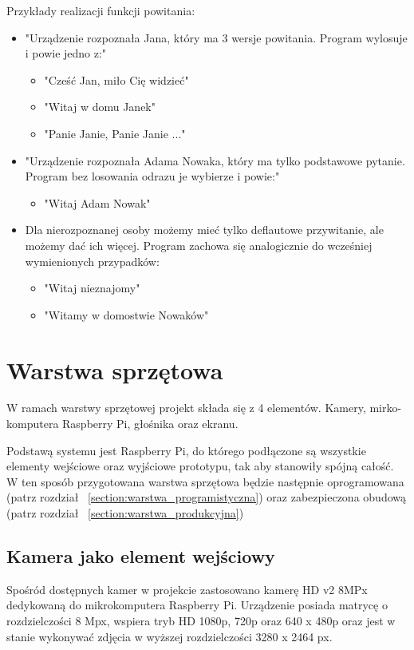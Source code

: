 \documentclass[a4paper,12pt,reqno]{article}
\begin{document}
Przykłady realizacji funkcji powitania:
\begin{itemize}
	\item "Urządzenie rozpoznała Jana, który ma 3 wersje powitania. Program wylosuje i powie jedno z:"
	\begin{itemize}
		\item "Cześć Jan, miło Cię widzieć"
		\item "Witaj w domu Janek"
		\item "Panie Janie, Panie Janie ..." %
	\end{itemize}
	\item "Urządzenie rozpoznała Adama Nowaka, który ma tylko podstawowe pytanie. Program bez losowania odrazu je wybierze i powie:"
	\begin{itemize}
		\item "Witaj Adam Nowak"
	\end{itemize}
	\item Dla nierozpoznanej osoby możemy mieć tylko deflautowe przywitanie, ale możemy dać ich więcej. Program zachowa się analogicznie do wcześniej wymienionych przypadków:
	\begin{itemize}
		\item "Witaj nieznajomy"
		\item "Witamy w domostwie Nowaków"
	\end{itemize}
\end{itemize}

\newpage
\section{Warstwa sprzętowa} \label{section:warstwa_sprzetowa}

W ramach warstwy sprzętowej projekt składa się z 4 elementów. Kamery, mirko-komputera Raspberry Pi, głośnika oraz ekranu.

Podstawą systemu jest Raspberry Pi, do którego podłączone są wszystkie elementy wejściowe oraz wyjściowe prototypu, tak aby stanowiły spójną całość. W ten sposób przygotowana warstwa sprzętowa będzie następnie oprogramowana (patrz rozdział ~\ref{section:warstwa_programistyczna}) oraz zabezpieczona obudową (patrz rozdział ~\ref{section:warstwa_produkcyjna})

\subsection{Kamera jako element wejściowy}

Spośród dostępnych kamer w projekcie zastosowano kamerę  HD v2 8MPx dedykowaną do mikrokomputera Raspberry Pi. Urządzenie posiada matrycę o rozdzielczości 8 Mpx, wspiera tryb HD 1080p, 720p oraz 640 x 480p oraz jest w stanie wykonywać zdjęcia w wyższej rozdzielczości 3280 x 2464 px.
\end{document}
